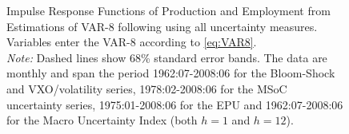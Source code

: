 \documentclass[a4paper,11pt,listof=nochaptergap,oneside,pointednumbers,bibtotoc,bigheadings,liststotoc]{scrbook}
\begin{document}
\begin{figure}[!h]
   \centering
   \setlength\fboxsep{0pt}
   \setlength\fboxrule{0pt}
      \caption[Impulse Response Functions of Production and Employment from Estimations of VAR-8 following \citet{bloom:09} using all uncertainty measures.]{Impulse Response Functions of Production and Employment from Estimations of VAR-8 following \citet{bloom:09} using all uncertainty measures. Variables enter the VAR-8 according to \ref{eq:VAR8}.\\
      \textit{Note:} Dashed lines show 68\% standard error bands. The data are monthly and span the period 1962:07-2008:06 for the Bloom-Shock and VXO/volatility series, 1978:02-2008:06 for the MSoC uncertainty series, 1975:01-2008:06 for the EPU and 1962:07-2008:06 for the Macro Uncertainty Index (both $h=1$ and $h=12$).}   \label{fig:VAR8_HP_until2008}
\end{figure}
\end{document}
